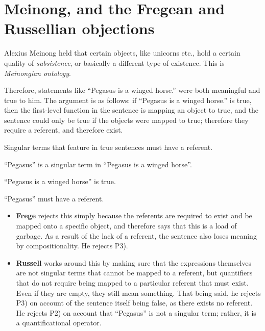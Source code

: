 \section{Meinong, and the Fregean and Russellian objections}

Alexius Meinong held that certain objects, like unicorns etc., hold a certain quality of \emph{subsistence}, or basically a different type of existence. This is \emph{Meinongian ontology}.

Therefore, statements like ``Pegasus is a winged horse.'' were both meaningful and true to him. The argument is as follows: if ``Pegasus is a winged horse.'' is true, then the first-level function in the sentence is mapping an object to true, and the sentence could only be true if the objects were mapped to true; therefore they require a referent, and therefore exist.

\begin{argument}[Meinong]\leavevmode
\begin{premises}
  \item[P1)] Singular terms that feature in true sentences must have a referent.
  \item[P2)] ``Pegasus'' is a singular term in ``Pegasus is a winged horse''.
  \item[P3)] ``Pegasus is a winged horse'' is true.
  \item[C)] ``Pegasus'' must have a referent.
\end{premises}
\end{argument}

\begin{itemize}
  \item \textbf{Frege} rejects this simply because the referents are required to exist and be mapped onto a specific object, and therefore says that this is a load of garbage. As a result of the lack of a referent, the sentence also loses meaning by compositionality. He rejects P3).
  \item \textbf{Russell} works around this by making sure that the expressions themselves are not singular terms that cannot be mapped to a referent, but quantifiers that do not require being mapped to a particular referent that must exist. Even if they are empty, they still mean something. That being said, he rejects P3) on account of the sentence itself being false, as there exists no referent. He rejects P2) on account that ``Pegasus'' is not a singular term; rather, it is a quantificational operator.
\end{itemize}
